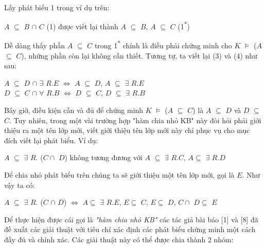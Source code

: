 \\
Lấy phát biểu 1 trong ví dụ trên:
\begin{center}
$A$ $\subseteq$ $B$ $\cap$ $C$ (1) được viết lại thành $A$ $\subseteq$ $B$, $A$ $\subseteq$ $C$ (1\textsuperscript{*})
\end{center}
Dễ dàng thấy phần $A$ $\subseteq$ $C$ trong 1\textsuperscript{*} chính là điều phải chứng minh cho $K$ $\models$ ($A$ $\subseteq$ $C$), những phần còn lại không cần thiết. Tương tự, ta viết lại (3) và (4) như sau:
\begin{center}
$A$ $\subseteq$ $D$ $\cap$ $\exists$ $R.E$  $\Leftrightarrow$ $A$ $\subseteq$ $D$, $A$ $\subseteq$ $\exists$ $R.E$
\\
$D$ $\subseteq$ $C$ $\cap$ $\forall$ $R.B$ $\Leftrightarrow$ $D$ $\subseteq$ $C$, $D$ $\subseteq$ $\exists$ $R.B$
\end{center}
Bây giờ, điều kiện cần và đủ để chứng minh $K$ $\models$ ($A$ $\subseteq$ $C$) là $A$ $\subseteq$ $D$ và $D$ $\subseteq$ $C$. Tuy nhiên, trong một vài trường hợp "hàm chia nhỏ KB" này đòi hỏi phải giới thiệu ra một tên lớp mới, viết giới thiệu tên lớp mới này chỉ phục vụ cho mục đích viết lại phát biểu. Ví dụ:	
\begin{center}
$A$ $\subseteq$ $\exists$ $R.$ ($C\cap$ $D$) không tương đương với $A$ $\subseteq$ $\exists$ $R.C$, $A\subseteq$ $\exists$ $R.D$
\end{center}
Để chia nhỏ phát biểu trên chúng ta sẽ giới thiệu một tên lớp mới, gọi là $E$.	Như vậy ta có:
\begin{center}
$A$ $\subseteq$ $\exists$ $R.$ ($C$ $\cap$ $D$) $\Leftrightarrow$ $A\subseteq$ $\exists$ $R.E$, $E\subseteq$ $C$, $E\subseteq$ $D$, $C\cap$ $D\subseteq$ $E$
\end{center}
Để thực hiện được cái gọi là \textit{"hàm chia nhỏ KB"} các tác giả bài báo [1] và [8] đã đề xuất các giải thuật với tiêu chí xác định các phát biểu chứng minh một cách đầy đủ và chính xác. Các giải thuật này có thể được chia thành 2 nhóm:
